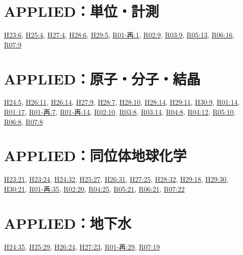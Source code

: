 \section{APPLIED：単位・計測}
\hyperref[q:h23-reg-applied-06]{H23:6}, \hyperref[q:h25-reg-applied-04]{H25:4}, \hyperref[q:h27-reg-applied-04]{H27:4}, \hyperref[q:h28-reg-applied-06]{H28:6}, \hyperref[q:h29-reg-applied-05]{H29:5}, \hyperref[q:r01-ret-applied-01]{R01-再:1}, \hyperref[q:r02-reg-applied-09]{R02:9}, \hyperref[q:r03-reg-applied-09]{R03:9}, \hyperref[q:r05-reg-applied-13]{R05:13}, \hyperref[q:r06-reg-applied-16]{R06:16}, \hyperref[q:r07-reg-applied-09]{R07:9}
\section{APPLIED：原子・分子・結晶}
\hyperref[q:h24-reg-applied-05]{H24:5}, \hyperref[q:h26-reg-applied-11]{H26:11}, \hyperref[q:h26-reg-applied-14]{H26:14}, \hyperref[q:h27-reg-applied-09]{H27:9}, \hyperref[q:h28-reg-applied-07]{H28:7}, \hyperref[q:h28-reg-applied-10]{H28:10}, \hyperref[q:h28-reg-applied-14]{H28:14}, \hyperref[q:h29-reg-applied-11]{H29:11}, \hyperref[q:h30-reg-applied-09]{H30:9}, \hyperref[q:r01-reg-applied-14]{R01:14}, \hyperref[q:r01-reg-applied-17]{R01:17}, \hyperref[q:r01-ret-applied-07]{R01-再:7}, \hyperref[q:r01-ret-applied-14]{R01-再:14}, \hyperref[q:r02-reg-applied-10]{R02:10}, \hyperref[q:r03-reg-applied-08]{R03:8}, \hyperref[q:r03-reg-applied-14]{R03:14}, \hyperref[q:r04-reg-applied-08]{R04:8}, \hyperref[q:r04-reg-applied-12]{R04:12}, \hyperref[q:r05-reg-applied-10]{R05:10}, \hyperref[q:r06-reg-applied-08]{R06:8}, \hyperref[q:r07-reg-applied-08]{R07:8}
\section{APPLIED：同位体地球化学}
\hyperref[q:h23-reg-applied-21]{H23:21}, \hyperref[q:h23-reg-applied-24]{H23:24}, \hyperref[q:h24-reg-applied-32]{H24:32}, \hyperref[q:h25-reg-applied-27]{H25:27}, \hyperref[q:h26-reg-applied-31]{H26:31}, \hyperref[q:h27-reg-applied-25]{H27:25}, \hyperref[q:h28-reg-applied-32]{H28:32}, \hyperref[q:h29-reg-applied-18]{H29:18}, \hyperref[q:h29-reg-applied-30]{H29:30}, \hyperref[q:h30-reg-applied-21]{H30:21}, \hyperref[q:r01-ret-applied-35]{R01-再:35}, \hyperref[q:r02-reg-applied-20]{R02:20}, \hyperref[q:r04-reg-applied-25]{R04:25}, \hyperref[q:r05-reg-applied-21]{R05:21}, \hyperref[q:r06-reg-applied-21]{R06:21}, \hyperref[q:r07-reg-applied-22]{R07:22}
\section{APPLIED：地下水}
\hyperref[q:h24-reg-applied-35]{H24:35}, \hyperref[q:h25-reg-applied-29]{H25:29}, \hyperref[q:h26-reg-applied-24]{H26:24}, \hyperref[q:h27-reg-applied-23]{H27:23}, \hyperref[q:r01-ret-applied-29]{R01-再:29}, \hyperref[q:r07-reg-applied-19]{R07:19}
